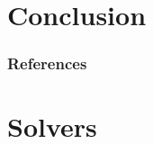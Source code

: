 \documentclass[aspectratio=169]{beamer}
\newcounter{a}
\newcounter{b}
\begin{document}

\section{Conclusion}



\begin{frame}[allowframebreaks]
    \frametitle{References}
    
    
\end{frame}

\appendix
\backupbegin



\section{Solvers}


\backupend
\end{document}

